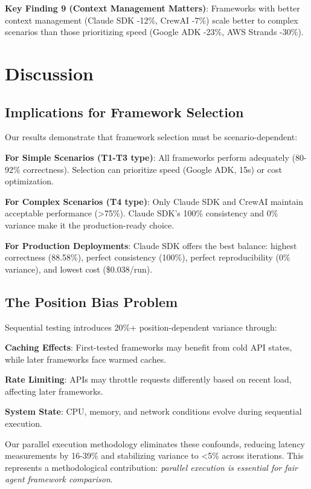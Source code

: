 \documentclass[sigconf,nonacm]{acmart}
\begin{document}
\textbf{Key Finding 9 (Context Management Matters)}: Frameworks with better context management (Claude SDK -12\%, CrewAI -7\%) scale better to complex scenarios than those prioritizing speed (Google ADK -23\%, AWS Strands -30\%).

\section{Discussion}

\subsection{Implications for Framework Selection}

Our results demonstrate that framework selection must be scenario-dependent:

\textbf{For Simple Scenarios (T1-T3 type)}: All frameworks perform adequately (80-92\% correctness). Selection can prioritize speed (Google ADK, 15s) or cost optimization.

\textbf{For Complex Scenarios (T4 type)}: Only Claude SDK and CrewAI maintain acceptable performance (>75\%). Claude SDK's 100\% consistency and 0\% variance make it the production-ready choice.

\textbf{For Production Deployments}: Claude SDK offers the best balance: highest correctness (88.58\%), perfect consistency (100\%), perfect reproducibility (0\% variance), and lowest cost (\$0.038/run).

\subsection{The Position Bias Problem}

Sequential testing introduces 20\%+ position-dependent variance through:

\textbf{Caching Effects}: First-tested frameworks may benefit from cold API states, while later frameworks face warmed caches.

\textbf{Rate Limiting}: APIs may throttle requests differently based on recent load, affecting later frameworks.

\textbf{System State}: CPU, memory, and network conditions evolve during sequential execution.

Our parallel execution methodology eliminates these confounds, reducing latency measurements by 16-39\% and stabilizing variance to <5\% across iterations. This represents a methodological contribution: \textit{parallel execution is essential for fair agent framework comparison}.
\end{document}
